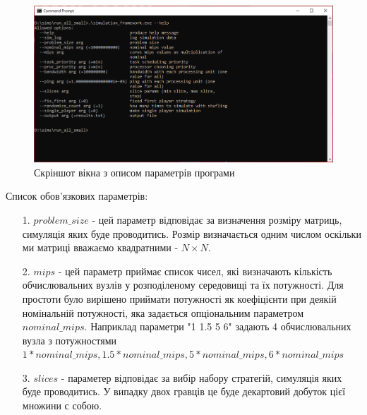 \begin{figure}[H]
	\centering
	\includegraphics[width=\textwidth]{practice/img/help_ilustration}
	\caption{Скріншот вікна з описом параметрів програми}
	\label{fig:help_ilustration}
\end{figure}

Список обов'язкових параметрів:
\begin{itemize}
	\item[1.] $problem\_size$ - цей параметр відповідає за визначення розміру матриць, симуляція яких буде проводитись. Розмір визначається одним числом оскільки ми матриці вважаємо квадратними - $N \times N$.
	\item[2.] $mips$ - цей параметр приймає список чисел, які визначають кількість обчислювальних вузлів у розподіленому середовищі та їх потужності. Для простоти було вирішено приймати потужності як коефіцієнти при деякій номінальній потужності, яка задається опціональним параметром $nominal\_mips$. Наприклад параметри "1 1.5 5 6" задають 4 обчислювальних вузла з потужностями $1*nominal\_mips, 1.5*nominal\_mips, 5*nominal\_mips, 6*nominal\_mips$
	\item[3.] $slices$ - параметер відповідає за вибір набору стратегій, симуляція яких буде проводитись. У випадку двох гравців це буде декартовий добуток цієї множини с собою.
\end{itemize}

